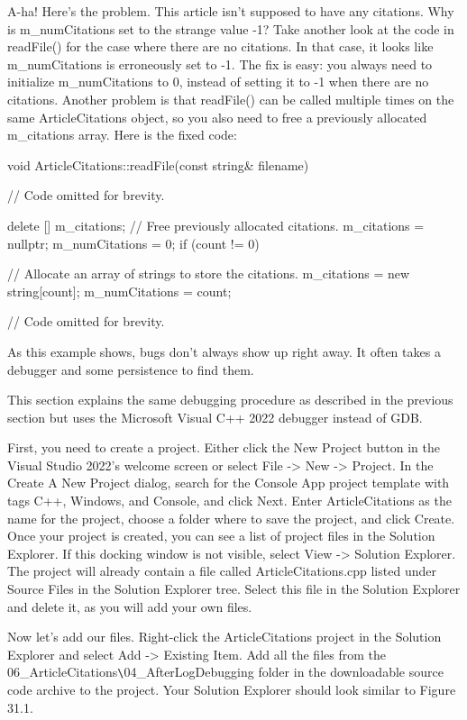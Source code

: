 A-ha! Here’s the problem. This article isn’t supposed to have any citations. Why is m\_numCitations set to the strange value -1? Take another look at the code in readFile() for the case where there are no citations. In that case, it looks like m\_numCitations is erroneously set to -1. The fix is easy: you always need to initialize m\_numCitations to 0, instead of setting it to -1 when there are no citations. Another problem is that readFile() can be called multiple times on the same ArticleCitations object, so you also need to free a previously allocated m\_citations array. Here is the fixed code:

\begin{cpp}
void ArticleCitations::readFile(const string& filename)
{
    // Code omitted for brevity.

    delete [] m_citations; // Free previously allocated citations.
    m_citations = nullptr;
    m_numCitations = 0;
    if (count != 0) {
        // Allocate an array of strings to store the citations.
        m_citations = new string[count];
        m_numCitations = count;

        // Code omitted for brevity.
    }
}
\end{cpp}

As this example shows, bugs don’t always show up right away. It often takes a debugger and some persistence to find them.


This section explains the same debugging procedure as described in the previous section but uses the Microsoft Visual C++ 2022 debugger instead of GDB.

First, you need to create a project. Either click the New Project button in the Visual Studio 2022’s welcome screen or select File -> New -> Project. In the Create A New Project dialog, search for the Console App project template with tags C++, Windows, and Console, and click Next. Enter ArticleCitations as the name for the project, choose a folder where to save the project, and click Create. Once your project is created, you can see a list of project files in the Solution Explorer. If this docking window is not visible, select View -> Solution Explorer. The project will already contain a file called ArticleCitations.cpp listed under Source Files in the Solution Explorer tree. Select this file in the Solution Explorer and delete it, as you will add your own files.

Now let’s add our files. Right-click the ArticleCitations project in the Solution Explorer and select Add -> Existing Item. Add all the files from the 06\_ArticleCitations\verb|\|04\_AfterLogDebugging folder in the downloadable source code archive to the project. Your Solution Explorer should look similar to Figure 31.1.

